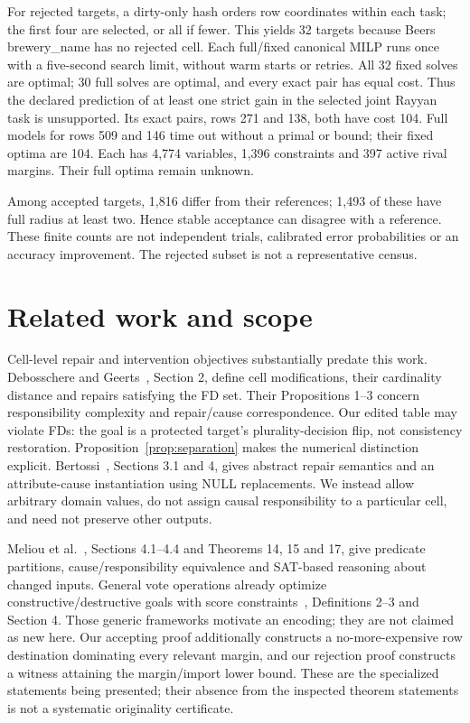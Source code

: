 \documentclass[11pt]{article}
\begin{document}
For rejected targets, a dirty-only hash orders row coordinates within each
task; the first four are selected, or all if fewer. This yields 32 targets
because Beers brewery\_name has no rejected cell. Each full/fixed canonical
MILP runs once with a five-second search limit, without warm starts or retries.
All 32 fixed solves are optimal; 30 full solves are optimal, and every exact
pair has equal cost. Thus the declared prediction of at least one strict gain
in the selected joint Rayyan task is unsupported. Its exact pairs, rows 271
and 138, both have cost 104. Full models for rows 509 and 146 time out without
a primal or bound; their fixed optima are 104. Each has 4,774 variables, 1,396
constraints and 397 active rival margins. Their full optima remain unknown.

Among accepted targets, 1,816 differ from their references; 1,493 of these have
full radius at least two. Hence stable acceptance can disagree with a reference.
These finite counts are not independent trials, calibrated error probabilities
or an accuracy improvement. The rejected subset is not a representative census.

\section{Related work and scope}
Cell-level repair and intervention objectives substantially predate this work.
Debosschere and Geerts~\cite{cellcauses}, Section 2, define cell modifications,
their cardinality distance and repairs satisfying the FD set. Their
Propositions 1--3 concern responsibility complexity and repair/cause
correspondence. Our edited table may violate FDs: the goal is a protected
target's plurality-decision flip, not consistency restoration.
Proposition~\ref{prop:separation} makes the numerical distinction explicit.
Bertossi~\cite{bertossi}, Sections 3.1 and 4, gives abstract repair semantics
and an attribute-cause instantiation using NULL replacements. We instead allow
arbitrary domain values, do not assign causal responsibility to a particular
cell, and need not preserve other outputs.

Meliou et al.~\cite{vcc}, Sections 4.1--4.4 and Theorems 14, 15 and 17,
give predicate partitions, cause/responsibility equivalence and SAT-based
reasoning about changed inputs. General vote operations already optimize
constructive/destructive goals with score constraints~\cite{xia},
Definitions 2--3 and Section 4. Those generic frameworks motivate an encoding;
they are not claimed as new here. Our accepting proof additionally constructs
a no-more-expensive row destination dominating every relevant margin, and our
rejection proof constructs a witness attaining the margin/import lower bound.
These are the specialized statements being presented; their absence from the
inspected theorem statements is not a systematic originality certificate.
\end{document}
